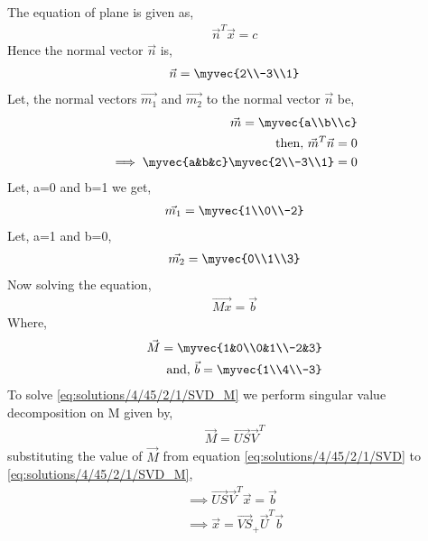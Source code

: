 The equation of plane is given as, 
\begin{align}
\vec{n}^T\vec{x} = c
\end{align}
Hence the normal vector $\vec{n}$ is,
\begin{align}
\vec{n} = \myvec{2\\-3\\1}
\end{align}
Let, the normal vectors $\vec{m_1}$ and $\vec{m_2}$ to the normal vector $\vec{n}$ be, 
\begin{align}
\vec{m} = \myvec{a\\b\\c}\\
\mbox{then, } \vec{m}^T\vec{n} = 0\\
\implies \myvec{a&b&c}\myvec{2\\-3\\1} = 0
\end{align}  
Let, a=0 and b=1 we get,
\begin{align}
\vec{m_1} = \myvec{1\\0\\-2}
\end{align}
Let, a=1 and b=0,
\begin{align}
\vec{m_2} = \myvec{0\\1\\3}
\end{align}
Now solving the equation,
\begin{align}
\vec{Mx} = \vec{b}
\label{eq:solutions/4/45/2/1/SVD_M}
\end{align}
Where,
\begin{align}
\vec{M} = \myvec{1&0\\0&1\\-2&3}\\
\mbox{and, } \vec{b} = \myvec{1\\4\\-3}\label{eq:solutions/4/45/2/1/b}
\end{align}
To solve \eqref{eq:solutions/4/45/2/1/SVD_M} we perform singular value decomposition on M given by, 
\begin{align}
\vec{M} = \vec{US}\vec{V}^T
\label{eq:solutions/4/45/2/1/SVD}
\end{align}
substituting the value of $\vec{M}$ from equation \eqref{eq:solutions/4/45/2/1/SVD} to \eqref{eq:solutions/4/45/2/1/SVD_M},
\begin{align}
\implies \vec{US}\vec{V}^T\vec{x} = \vec{b}\\
\implies \vec{x} = \vec{VS}_+\vec{U}^T\vec{b} \label{eq:solutions/4/45/2/1/x}
\end{align}
